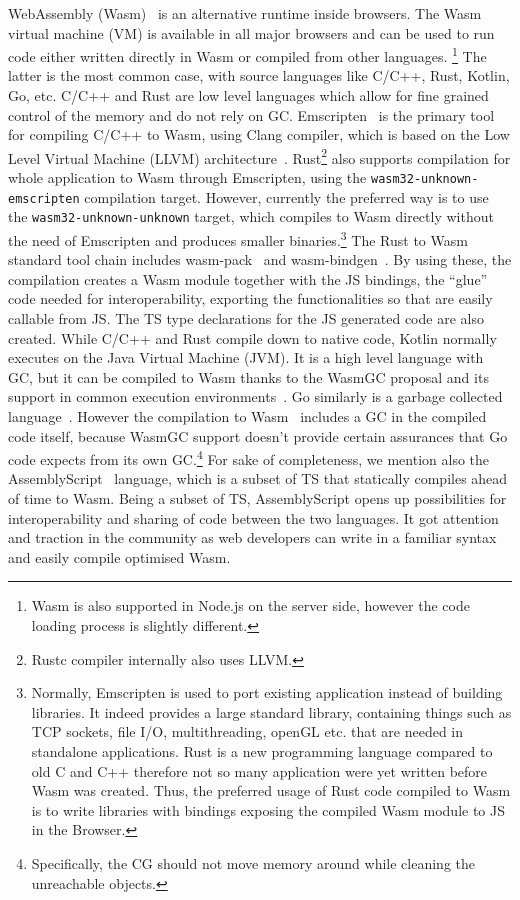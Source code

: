 WebAssembly (Wasm)~\cite{Haas2017,WasmSpecification} is an alternative runtime
inside browsers.
The Wasm virtual machine (VM) is available in all major
browsers and can be used to run code either written directly in Wasm
or compiled from other languages.
\footnote{Wasm is also supported in Node.js on the server side, however the
code loading process is slightly different.} 
The latter is the
most common case, with source languages like C/C++, Rust,
Kotlin, Go, etc. C/C++ and Rust are low level languages
which allow for fine grained control of the memory
and do not rely on GC. Emscripten~\cite{Zakai2011} is the primary 
tool for compiling C/C++ to Wasm, using Clang compiler,
which is based on the Low Level Virtual Machine
(LLVM) architecture~\cite{LLVM2004}.
Rust\footnote{Rustc compiler internally also uses LLVM.} also supports compilation for whole application to Wasm
through Emscripten, using the \texttt{wasm32-unknown-emscripten}
compilation target.
However, currently the preferred way is to use
the \texttt{wasm32-unknown-unknown} target, which
compiles to Wasm directly without the need of Emscripten
and produces smaller binaries.\footnote{Normally,
Emscripten is used to port existing application instead 
of building libraries. It indeed 
provides a large standard library, 
containing things such as TCP sockets, 
file I/O, multithreading, openGL etc. that are needed in
standalone applications.
Rust is a new programming language compared to
old C and C++ therefore not so many application were yet 
written before Wasm was created. 
Thus, the preferred usage of Rust code compiled to Wasm
is to write libraries with bindings exposing the
compiled Wasm module to JS in the Browser.}
The Rust to Wasm standard tool chain includes 
wasm-pack~\cite{WasmPack} and wasm-bindgen~\cite{WasmBindgen}.
By using these, the compilation creates a Wasm 
module together with the JS bindings, the ``glue'' code
needed for interoperability, exporting the functionalities
so that are easily callable from JS. The TS type declarations 
for the JS generated code are also created.
While C/C++ and Rust compile down to native code, Kotlin normally executes on the
Java Virtual Machine (JVM). It is a high level language with GC,
but it can be compiled to Wasm thanks to the WasmGC proposal
and its support in common execution environments~\cite{WasmGCProposal, WasmGCinV8}.
Go similarly is a garbage collected language~\cite{GoGarbageCollector}.
However the compilation to Wasm~\cite{GOWasm} 
includes a GC in the compiled code itself, because WasmGC support doesn't
provide certain assurances that Go code expects from its own GC.\footnote{Specifically, the CG should not move memory around while cleaning the unreachable objects.}
For sake of completeness, we mention also the AssemblyScript~\cite{AssemblyScript} language, 
which is a subset of TS that statically compiles ahead of time to Wasm.
Being a subset of TS, AssemblyScript opens up possibilities for
interoperability and sharing of code between the two languages.
It got attention and traction in the community as web developers 
can write in a familiar syntax and easily compile optimised Wasm.

